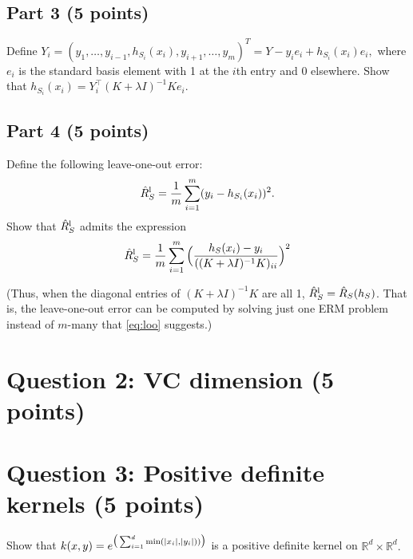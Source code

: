 \documentclass[12pt]{article}
\begin{document}
\subsection*{Part 3 (5 points)}
Define $Y_i = (y_1, \ldots, y_{i-1}, h_{S_i}(x_i), y_{i+1}, \ldots, y_m)^T = Y - y_i e_i + h_{S_i}(x_i) e_i,$ where $e_i$ is the standard basis element with 1 at the $i$th entry and 0 elsewhere. Show that $h_{S_i}(x_i) = Y_i^\top (K + \lambda I)^{-1} Ke_i$.

\newpage
\subsection*{Part 4 (5 points)}
Define the following leave-one-out error:
\begin{align}
	\label{eq:loo}
	\hat{R}_S^{\rm l} = \frac{1}{m} \sum_{i=1}^m (y_i - h_{S_i}(x_i))^2.
\end{align}
Show that $\hat{R}_S^{\rm l}$ admits the expression
\begin{align}
	\label{eq:loo-sol}
	\hat{R}_S^{\rm l} = \frac{1}{m} \sum_{i=1}^m \Big(\dfrac{h_S(x_i)-y_i}{((K + \lambda I)^{-1} K)_{ii}}\Big)^2
\end{align}

(Thus, when the diagonal entries of $(K + \lambda I)^{-1} K$ are all 1, $\hat{R}_S^{\rm l} = \hat{R}_S(h_S)$. That is, the leave-one-out error can be computed by solving just one ERM problem instead of $m$-many that \eqref{eq:loo} suggests.)

\newpage
\section*{Question 2: VC dimension (5 points)}



\section*{Question 3: Positive definite kernels (5 points)}
Show that $k(x,y) = e^{\big(\sum_{i=1}^d{\rm min}(|x_i|,|y_i|))\big)}$ is a positive definite kernel on $\mathbb{R}^d\times\mathbb{R}^d.$
 




\end{document}

